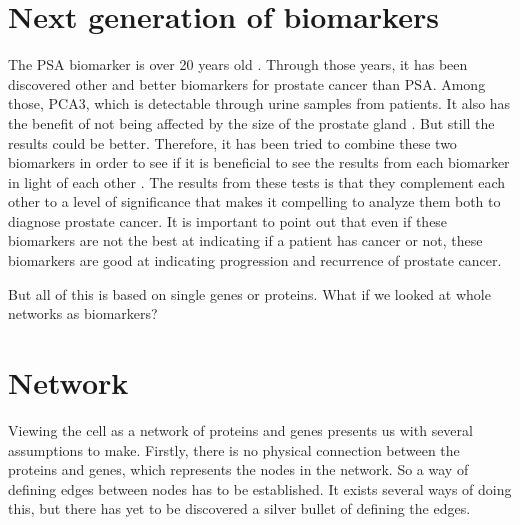 \documentclass[UKenglish,11pt,a4paper]{article}
\begin{document}
\section{Next generation of biomarkers}
The PSA biomarker is over 20 years old \cite{psa-age}. Through those years, it has been discovered other and better
biomarkers for prostate cancer than PSA. Among those, PCA3, which is detectable through urine samples from patients. It
also has the benefit of not being affected by the size of the prostate gland \cite{pca3-size}. But still the results
could be better. Therefore, it has been tried to combine these two biomarkers in order to see if it is beneficial to
see the results from each biomarker in light of each other \cite{beyondpsa}. The results from these tests is that they
complement each other to a level of significance that makes it compelling to analyze them both to diagnose prostate
cancer. It is important to point out that even if these biomarkers are not the best at indicating if a patient has 
cancer or not, these biomarkers are good at indicating progression and recurrence of prostate cancer.

But all of this is based on single genes or proteins. What if we looked at whole networks as biomarkers?

\section{Network}
Viewing the cell as a network of proteins and genes presents us with several assumptions to make. Firstly, there is no
physical connection between the proteins and genes, which represents the nodes in the network. So a way of defining
edges between nodes has to be established. It exists several ways of doing this, but there has yet to be discovered a
silver bullet of defining the edges. %
\end{document}

